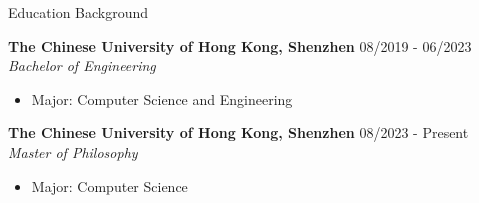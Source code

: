 \documentclass{resume} %
\begin{document}

\begin{rSection}{Education Background}

\setlength{\parskip}{2pt}

{\bf The Chinese University of Hong Kong, Shenzhen} \hfill {08/2019 - 06/2023}\\
\textit{Bachelor of Engineering}
\begin{itemize}
    \item Major: Computer Science and Engineering
\end{itemize}

{\bf The Chinese University of Hong Kong, Shenzhen} \hfill {08/2023 - Present}\\
\textit{Master of Philosophy}
\begin{itemize}
    \item Major: Computer Science
\end{itemize}

\end{rSection}
\end{document}
